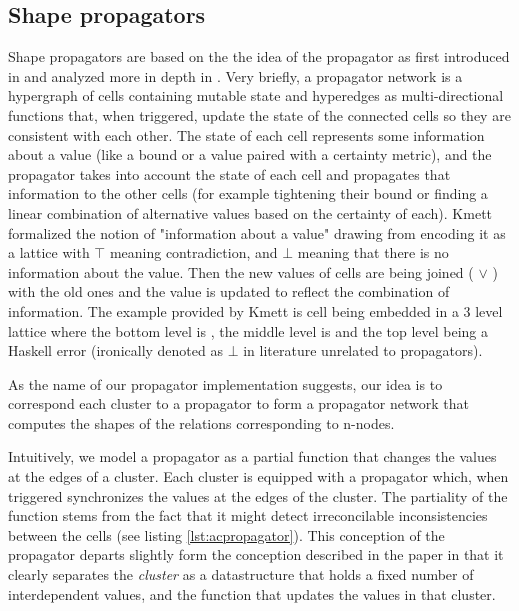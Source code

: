 \subsection{Shape propagators}
\label{sec:shape_propagators}

Shape propagators are based on the the idea of the propagator as first
introduced in \cite{sussmanArtPropagator2009} and analyzed more in depth in
\cite{hansonSoftwareDesignFlexibility2021a}. Very briefly, a propagator
network is a hypergraph of cells containing mutable state and
hyperedges as multi-directional functions that, when triggered, update
the state of the connected cells so they are consistent with each
other. The state of each cell represents some information about a
value (like a bound or a value paired with a certainty metric), and
the propagator takes into account the state of each cell and
propagates that information to the other cells (for example tightening
their bound or finding a linear combination of alternative values
based on the certainty of each). Kmett \cite{kmettPropagators2021}
formalized the notion of "information about a value" drawing from
\cite{kuperLVarsLatticebasedData2013} encoding it as a lattice with
\(\top\) meaning contradiction, and \(\bot\) meaning that there is no
information about the value. Then the new values of cells are being
joined ( \(\lor\) ) with the old ones and the value is updated to
reflect the combination of information. The example provided by Kmett
is cell being embedded in a 3 level lattice where the bottom level is
, the middle level is  and the top level
being a Haskell error (ironically denoted as \(\bot\) in literature
unrelated to propagators).

As the name of our propagator implementation suggests, our idea is to
correspond each cluster to a propagator to form a propagator network
that computes the shapes of the relations corresponding to n-nodes.

Intuitively, we model a propagator as a partial function that changes
the values at the edges of a cluster. Each cluster
is equipped with a propagator which, when
triggered synchronizes the values at the edges of the cluster. The
partiality of the function stems from the fact that it might detect
irreconcilable inconsistencies between the cells (see listing
\ref{lst:acpropagator}). This conception of the propagator departs slightly
form the conception described in the paper in that it clearly
separates the \emph{cluster} as a datastructure that holds a fixed
number of interdependent values, and the function that updates the
values in that cluster.

